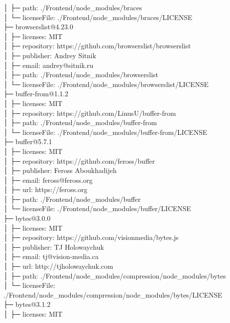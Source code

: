│  ├─ path: ./Frontend/node\_modules/braces\\
│  └─ licenseFile: ./Frontend/node\_modules/braces/LICENSE\\
├─ browserslist@4.23.0\\
│  ├─ licenses: MIT\\
│  ├─ repository: https://github.com/browserslist/browserslist\\
│  ├─ publisher: Andrey Sitnik\\
│  ├─ email: andrey@sitnik.ru\\
│  ├─ path: ./Frontend/node\_modules/browserslist\\
│  └─ licenseFile: ./Frontend/node\_modules/browserslist/LICENSE\\
├─ buffer-from@1.1.2\\
│  ├─ licenses: MIT\\
│  ├─ repository: https://github.com/LinusU/buffer-from\\
│  ├─ path: ./Frontend/node\_modules/buffer-from\\
│  └─ licenseFile: ./Frontend/node\_modules/buffer-from/LICENSE\\
├─ buffer@5.7.1\\
│  ├─ licenses: MIT\\
│  ├─ repository: https://github.com/feross/buffer\\
│  ├─ publisher: Feross Aboukhadijeh\\
│  ├─ email: feross@feross.org\\
│  ├─ url: https://feross.org\\
│  ├─ path: ./Frontend/node\_modules/buffer\\
│  └─ licenseFile: ./Frontend/node\_modules/buffer/LICENSE\\
├─ bytes@3.0.0\\
│  ├─ licenses: MIT\\
│  ├─ repository: https://github.com/visionmedia/bytes.js\\
│  ├─ publisher: TJ Holowaychuk\\
│  ├─ email: tj@vision-media.ca\\
│  ├─ url: http://tjholowaychuk.com\\
│  ├─ path: ./Frontend/node\_modules/compression/node\_modules/bytes\\
│  └─ licenseFile: ./Frontend/node\_modules/compression/node\_modules/bytes/LICENSE\\
├─ bytes@3.1.2\\
│  ├─ licenses: MIT\\
